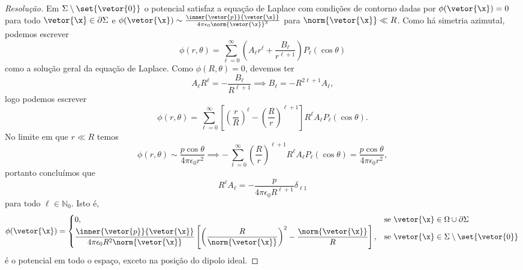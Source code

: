 \begin{proof}[Resolução]
    Em \(\Sigma\setminus \set{\vetor{0}}\) o potencial satisfaz a equação de Laplace com condições de contorno dadas por \(\phi(\vetor{\x}) = 0\) para todo \(\vetor{\x} \in \partial \Sigma\) e \(\phi(\vetor{\x}) \sim \frac{\inner{\vetor{p}}{\vetor{\x}}}{4\pi \epsilon_0 \norm{\vetor{\x}}^3}\) para \(\norm{\vetor{\x}} \ll R\). Como há simetria azimutal, podemos escrever
    \begin{equation*}
        \phi(r,\theta) = \sum_{\ell = 0}^\infty \left(A_\ell r^\ell + \frac{B_{\ell}}{r^{\ell + 1}}\right) P_\ell(\cos\theta)
    \end{equation*}
    como a solução geral da equação de Laplace. Como \(\phi(R, \theta) = 0\), devemos ter
    \begin{equation*}
        A_\ell R^\ell = - \frac{B_{\ell}}{R^{\ell + 1}} \implies B_{\ell} = -R^{2\ell + 1} A_{\ell},
    \end{equation*}
    logo podemos escrever
    \begin{equation*}
        \phi(r, \theta) = \sum_{\ell = 0}^\infty \left[\left(\frac{r}{R}\right)^{\ell} - \left(\frac{R}{r}\right)^{\ell + 1}\right] R^\ell A_\ell P_{\ell}(\cos\theta).
    \end{equation*}
    No limite em que \(r \ll R\) temos
    \begin{equation*}
        \phi(r, \theta) \sim \frac{p \cos\theta}{4\pi \epsilon_0 r^2} \implies -\sum_{\ell = 0}^\infty \left(\frac{R}{r}\right)^{\ell + 1}R^\ell A_\ell P_{\ell}(\cos\theta) = \frac{p \cos\theta}{4\pi \epsilon_0 r^2},
    \end{equation*}
    portanto concluímos que
    \begin{equation*}
        R^\ell A_\ell = -\frac{p}{4\pi \epsilon_0 R^{\ell + 1}}\delta_{\ell 1}
    \end{equation*}
    para todo \(\ell \in \mathbb{N}_0\). Isto é,
    \begin{equation*}
        \phi(\vetor{\x}) = \begin{cases}
            0,&\text{se } \vetor{\x} \in \Omega \cup \partial \Sigma\\
            \displaystyle \frac{\inner{\vetor{p}}{\vetor{\x}}}{4\pi \epsilon_0 R^2 \norm{\vetor{\x}}}\left[\left(\frac{R}{\norm{\vetor{\x}}}\right)^2 - \frac{\norm{\vetor{\x}}}{R}\right],&\text{se }\vetor{\x} \in \Sigma \setminus\set{\vetor{0}}
        \end{cases}
    \end{equation*}
    é o potencial em todo o espaço, exceto na posição do dipolo ideal.


\end{proof}
